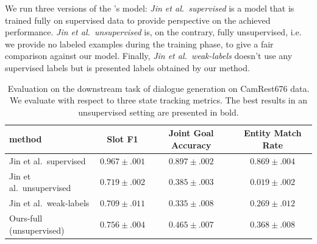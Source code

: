 We run three versions of the \citet{jin2018explicit}'s model: \emph{Jin et al.\ supervised} is a model that is trained fully on supervised data to provide perspective on the achieved performance.
\emph{Jin et al.\ unsupervised} is, on the contrary, fully unsupervised, i.e. we provide no labeled examples during the training phase, to give a fair comparison against our model.
Finally, \emph{Jin et al.\ weak-labels} doesn't use any supervised labels but is presented labels obtained by our method.

\begin{table}
    \centering
    \smaller
    \begin{tabular}{l|c|c|c}
    \hline
      \textbf{method} & \textbf{Slot F1} & \textbf{Joint Goal Accuracy} & \textbf{Entity Match Rate} \\
      \hline
        Jin et al.\ supervised & $0.967 \pm .001$ & $0.897 \pm .002$ & $0.869 \pm .004$ \\
        Jin et al.\ unsupervised & $0.719 \pm .002$ & $0.385 \pm .003$ & $0.019 \pm .002$ \\
        Jin et al.\ weak-labels & $0.709 \pm .011$ & $0.335 \pm .008$ & $0.269 \pm .012$ \\\hdashline[0.5pt/2pt]
        Ours-full (unsupervised) & $\pmb{0.756} \pm .004$ & $\pmb{0.465} \pm .007$ & $\pmb{0.368} \pm .008$ \\
     \hline
    \end{tabular}
    \caption{Evaluation on the downstream task of dialogue generation on CamRest676 data. We evaluate with respect to three state tracking metrics. The best results in an unsupervised setting are presented in bold.}
    \label{table:downstream}
\end{table}

